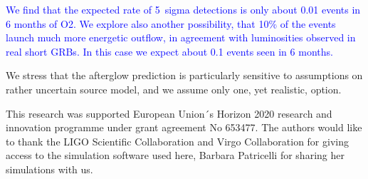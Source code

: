 \documentclass[11pt]{article}
\begin{document}
\textcolor{blue}{We find that the expected rate of 5~sigma detections is only about
0.01 events in 6 months of O2. We explore also another
possibility, that 10\% of the events launch much more energetic
outflow, in agreement with luminosities observed in real short
GRBs. In this case we expect about 0.1 events seen in 6 months.}

We stress that the afterglow prediction is particularly sensitive to
assumptions on rather uncertain source model, and we assume only
one, yet realistic, option.

\vspace{10mm}


{\linespread{0.1} \footnotesize This research was supported European Union´s Horizon 2020 research and
  innovation programme under grant agreement No 653477. The authors would like
  to thank the LIGO Scientific Collaboration and Virgo Collaboration for giving
  access to the simulation software used here, Barbara Patricelli for sharing
  her simulations with us.}


{\footnotesize
}
\end{document}
